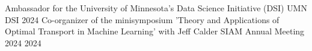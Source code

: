 

\begingroup
\begin{cvservices}
    \cvservice
        {Ambassador for the University of Minnesota's Data Science Initiative (DSI)} %
        {UMN DSI}
        {2024} %
    \cvservice
        {Co-organizer of the minisymposium 'Theory and Applications of Optimal Transport in Machine Learning' with Jeff Calder} %
        {SIAM Annual Meeting 2024}
        {2024} %
    \end{cvservices}
    
\endgroup

